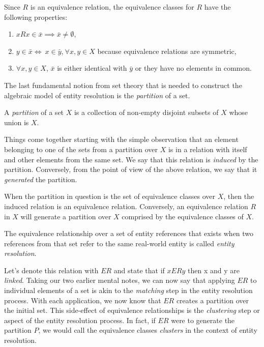 \documentclass[lettersize,journal]{IEEEtran}
\begin{document}
    Since $R$ is an equivalence relation, the equivalence classes for $R$ have the
    following properties\cite{hoffman1971linear}:
    \begin{enumerate}
        \item $xRx \in \bar{x} \implies \bar{x} \neq \emptyset$,
        \item $y\in\bar{x}\iff~x\in\bar{y}$,$~\forall x,y \in X$ because
        equivalence relations are symmetric,
        \item $\forall x,y \in X$, $\bar{x}$ is either identical with $\bar{y}$
        or they have no elements in common\cite{hoffman1971linear,Tal11}.
    \end{enumerate}
    
    The last fundamental notion from set theory that is needed to construct the
    algebraic model of entity resolution is the \textit{partition} of a set.

    \begin{defn}
        A \textit{partition} of a set $X$ is a collection of non-empty disjoint
        subsets of $X$ whose union is $X$\cite{halmos1960naive,Tal11}.
    \end{defn}

    Things come together starting with the simple observation that an element
    belonging to one of the sets from a partition over $X$ is in a relation with
    itself and other elements from the same set.
    We say that this relation is \textit{induced} by the partition.
    Conversely, from the point of view of the above relation, we say that it
    \textit{generated} the partition.

    When the partition in question is the set of equivalence classes over $X$,
    then the induced relation is an equivalence relation.
    Conversely, an equivalence relation $R$ in $X$ will generate a partition
    over $X$ comprised by the equivalence classes of $X$\cite{halmos1960naive,
    Tal11}.

    \begin{defn}
        The equivalence relationship over a set of entity references that exists
        when two references from that set refer to the same real-world entity is
        called \textit{entity resolution}.
    \end{defn}

    Let's denote this relation with $ER$ and state that if $xERy$ then x and y
    are \textit{linked}\cite{Tal11}.
    Taking our two earlier mental notes, we can now say that applying $ER$ to
    individual elements of a set is akin to the \textit{matching} step in the
    entity resolution process.
    With each application, we now know that $ER$ creates a partition over the
    initial set.
    This side-effect of equivalence relationships is the \textit{clustering}
    step or aspect of the entity resolution process.
    In fact, if $ER$ were to generate the partition $P$, we would call the
    equivalence classes \textit{clusters} in the context of entity resolution.
\end{document}
